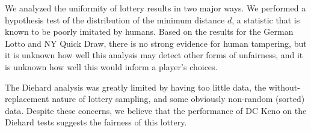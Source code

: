 We analyzed the uniformity of lottery results in two major ways. We performed a hypothesis test of the distribution of the minimum distance $d$, a statistic that is known to be poorly imitated by humans. Based on the results for the German Lotto and NY Quick Draw, there is no strong evidence for human tampering, but it is unknown how well this analysis may detect other forms of unfairness, and it is unknown how well this would inform a player's choices.


The Diehard analysis was greatly limited by having too little data, the without-replacement nature of lottery sampling, and some obviously non-random (sorted) data. Despite these concerns, we believe that the performance of DC Keno on the Diehard tests suggests the fairness of this lottery.
